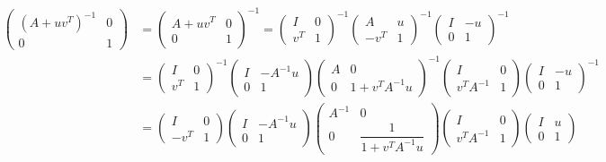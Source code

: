 \begin{align*}
\begin{pmatrix} (A + uv^T)^{-1} & 0 \\ 0 & 1 \end{pmatrix} & = \begin{pmatrix} A + uv^T & 0 \\ 0 & 1 \end{pmatrix}^{-1} = \begin{pmatrix} I & 0 \\ v^T & 1 \end{pmatrix}^{-1} \begin{pmatrix} A & u \\ -v^T & 1 \end{pmatrix}^{-1} \begin{pmatrix} I & -u \\ 0 & 1 \end{pmatrix}^{-1} \\
& = \begin{pmatrix} I & 0 \\ v^T & 1 \end{pmatrix}^{-1} \begin{pmatrix} I & -A^{-1}u \\ 0 & 1 \end{pmatrix} \begin{pmatrix} A & 0 \\ 0 & 1 + v^TA^{-1}u \end{pmatrix}^{-1} \begin{pmatrix} I & 0 \\ v^TA^{-1} & 1 \end{pmatrix} \begin{pmatrix} I & -u \\ 0 & 1 \end{pmatrix}^{-1} \\
& = \begin{pmatrix} I & 0 \\ -v^T & 1 \end{pmatrix} \begin{pmatrix} I & -A^{-1}u \\ 0 & 1 \end{pmatrix} \begin{pmatrix} A^{-1} & 0 \\ 0 & \dfrac{1}{1 + v^TA^{-1}u} \end{pmatrix} \begin{pmatrix} I & 0 \\ v^TA^{-1} & 1 \end{pmatrix} \begin{pmatrix} I & u \\ 0 & 1 \end{pmatrix} \\

\end{align*}
